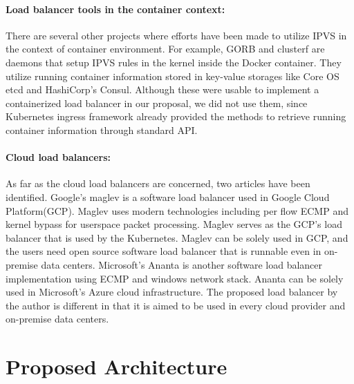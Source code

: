 \paragraph{\bf Load balancer tools in the container context:}
There are several other projects where efforts have been made to utilize IPVS in the context of container environment.
For example, GORB\cite{Sibiryov2015} and clusterf\cite{Aaltodoc:http://urn.fi/URN:NBN:fi:aalto-201611025433} are daemons 
that setup IPVS rules in the kernel inside the Docker container. 
They utilize running container information stored in key-value storages
like Core OS etcd\cite{CoreOSEtcd} and HashiCorp's Consul\cite{HashiCorpConsul}. 
Although these were usable to implement a containerized load balancer in our proposal, we did not use them, 
since Kubernetes ingress framework already provided the methods to retrieve running container information through standard API.

\paragraph{\bf Cloud load balancers:}

As far as the cloud load balancers are concerned, two articles have been identified.
Google's maglev\cite{eisenbud2016maglev} is a software load balancer used in Google Cloud Platform(GCP)\cite{Voellm2013}.
Maglev uses modern technologies including per flow ECMP and kernel bypass for userspace packet processing.
Maglev serves as the GCP's load balancer that is used by the Kubernetes.
Maglev can be solely used in GCP, and the users need open source software load balancer that is runnable even in on-premise data centers.
Microsoft's Ananta\cite{patel2013ananta} is another software load balancer implementation using ECMP and windows network stack.
Ananta can be solely used in Microsoft's Azure cloud infrastructure\cite{patel2013ananta}.
The proposed load balancer by the author is different in that it is aimed to be used in every cloud provider and on-premise data centers.

\section{Proposed Architecture}\label{Architecture}


